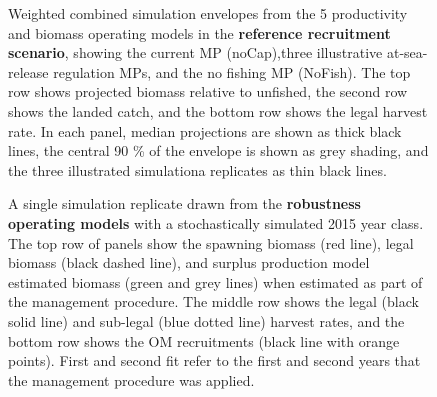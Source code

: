 \documentclass[11pt]{book}
\begin{document}
\begin{landscape}
\begin{figure}[htb]
{}

\caption{Weighted combined simulation envelopes from the 5 productivity and biomass operating models in the \textbf{reference recruitment scenario}, showing the current MP (noCap),three illustrative at-sea-release regulation MPs, and the no fishing MP (NoFish). The top row shows projected biomass relative to unfished, the second row shows the landed catch, and the bottom row shows the legal harvest rate. In each panel, median projections are shown as thick black lines, the central 90 \% of the envelope is shown as grey shading, and the three illustrated simulationa replicates as thin black lines.}\label{fig:unnamed-chunk-22}
\end{figure}
\newpage
\begin{figure}[htb]

{\centering {} 

}

\caption{A single simulation replicate drawn from the \textbf{robustness operating models} with a stochastically simulated 2015 year class. The top row of panels show the spawning biomass (red line), legal biomass (black dashed line), and surplus production model estimated biomass (green and grey lines) when estimated as part of the management procedure. The middle row shows the legal (black solid line) and sub-legal (blue dotted line) harvest rates, and the bottom row shows the OM recruitments (black line with orange points). First and second fit refer to the first and second years that the management procedure was applied.}\label{fig:unnamed-chunk-23}
\end{figure}
\newpage
\begin{figure}[htb]


\end{figure}
\end{landscape}
\end{document}
